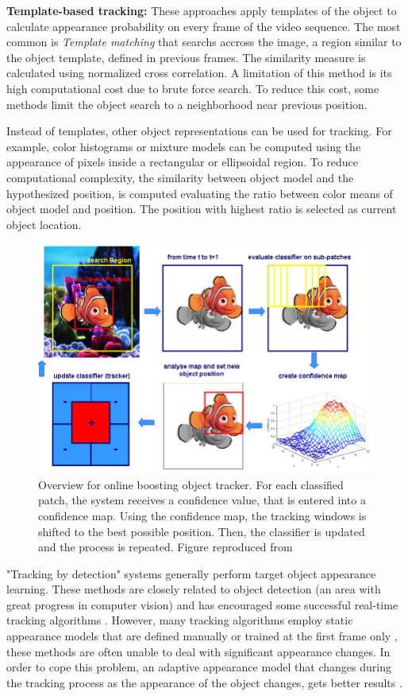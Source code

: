 \textbf{Template-based tracking:}  These approaches apply templates of the
object to calculate appearance probability on every frame of the
video sequence. The most common is \textit{Template \gls{matching}} \cite{Korman2013}
that searchs accross the image, a region similar to the object template, defined
in previous frames. The similarity measure is calculated using normalized cross
correlation. A limitation of this method is its high computational cost due to
brute force search. To reduce this cost, some methods limit the object search
to a neighborhood near previous position.

Instead of templates, other object representations can be used for tracking.
For example, color histograms or mixture models can be computed using the
appearance of pixels inside a rectangular or ellipsoidal region. To reduce
computational complexity, the similarity between object model and the
hypothesized position, is computed evaluating the ratio between color means of
object model and position. The position with highest ratio is selected as
current object location.

\begin{figure}[t]
	\centering
		\includegraphics[width=0.7\linewidth]{Figures/overview_boost.png}
	\caption[Overview for online boosting object tracker]
	{Overview for online boosting object tracker. For each classified patch,
	the system receives a confidence value, that is entered into a 
	confidence map. Using the confidence map, the tracking windows is
	shifted to the best possible position. Then, the classifier is updated and
	the	process is repeated. Figure reproduced from \cite{Grabner2006}}
	\label{fig::overview_boost}
\end{figure}	

"Tracking by detection" \cite{Mori2006} systems generally perform target object
appearance learning. These methods are closely related to object detection
(an area with great progress in computer vision) and has encouraged some
successful real-time tracking algorithms \cite{Liu2007,Grabner2006}. However,
many tracking algorithms employ static appearance models that are defined
manually or trained at the first frame only \cite{Isard2001, Lepetit2006,
Black1996, Comaniciu2000, Adam2006}, these methods are often unable to deal
with significant appearance changes. In order to cope this problem, an adaptive
appearance model that changes during the tracking process as the appearance of
the object changes, gets better results \cite{Ross2007,Matthews2004,Jepson2003}.

